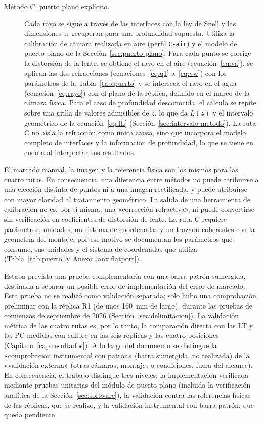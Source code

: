 \begin{description}
  \item[Método C: puerto plano explícito.] Cada rayo se sigue a través de las interfaces con la ley de Snell y las dimensiones se recuperan para una profundidad supuesta. Utiliza la calibración de cámara realizada en aire (perfil \texttt{C-air}) y el modelo de puerto plano de la Sección~\ref{sec:puerto-plano}. Para cada punto se corrige la distorsión de la lente, se obtiene el rayo en el aire (ecuación~\ref{eq:va}), se aplican las dos refracciones (ecuaciones~\ref{eq:q1} a~\ref{eq:vw}) con los parámetros de la Tabla~\ref{tab:puerto} y se interseca el rayo en el agua (ecuación~\ref{eq:rayo}) con el plano de la réplica, definido en el marco de la cámara física. Para el caso de profundidad desconocida, el cálculo se repite sobre una grilla de valores admisibles de $z$, lo que da $L(z)$ y el intervalo geométrico de la ecuación~\eqref{eq:IL} (Sección~\ref{sec:intervalo-metodo}). La ruta C no aísla la refracción como única causa, sino que incorpora el modelo completo de interfaces y la información de profundidad, lo que se tiene en cuenta al interpretar sus resultados.
\end{description}

El marcado manual, la imagen y la referencia física son los mismos para las cuatro rutas. En consecuencia, una diferencia entre métodos no puede atribuirse a una elección distinta de puntos ni a una imagen rectificada, y puede atribuirse con mayor claridad al tratamiento geométrico. La salida de una herramienta de calibración no es, por sí misma, una «corrección refractiva», ni puede convertirse sin verificación en coeficientes de distorsión de lente. La ruta C requiere parámetros, unidades, un sistema de coordenadas y un trazado coherentes con la geometría del montaje; por ese motivo se documentan los parámetros que consume, sus unidades y el sistema de coordenadas que utiliza (Tabla~\ref{tab:puerto} y Anexo~\ref{anx:flatport}).

Estaba prevista una prueba complementaria con una barra patrón sumergida, destinada a separar un posible error de implementación del error de marcado. Esta prueba no se realizó como validación separada; solo hubo una comprobación preliminar con la réplica R1 (de unos 160~mm de largo), durante las pruebas de comienzos de septiembre de 2026 (Sección~\ref{sec:delimitacion}). La validación métrica de las cuatro rutas es, por lo tanto, la comparación directa con las LT y las PC medidas con calibre en las seis réplicas y las cuatro posiciones (Capítulo~\ref{cap:resultados}). A lo largo del documento se distingue la «comprobación instrumental con patrón» (barra sumergida, no realizada) de la «validación externa» (otras cámaras, montajes o condiciones, fuera del alcance). En consecuencia, el trabajo distingue tres niveles: la implementación verificada mediante pruebas unitarias del módulo de puerto plano (incluida la verificación analítica de la Sección~\ref{sec:software}), la validación contra las referencias físicas de las réplicas, que se realizó, y la validación instrumental con barra patrón, que queda pendiente.

